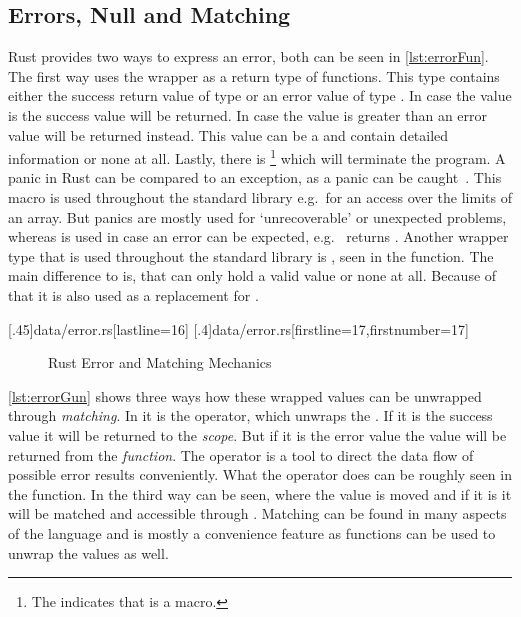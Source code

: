 \documentclass[thesis]{subfiles}
\begin{document}
  \subsection{Errors, Null and Matching}\label{sec:rustErr}
    Rust provides two ways to express an error, both can be seen in \autoref{lst:errorFun}.
    The first way uses the  wrapper as a return type of functions.
    This type contains either the success return value of type \T or an error value of type .
    In case the value is  the success value will be returned.
    In case the value is greater than  an error value will be returned instead.
    This value can be a \struct and contain detailed information or none at all.
    Lastly, there is \footnote{%
      The \codr{!} indicates that  is a macro.
    } which will terminate the program.
    A panic in Rust can be compared to an exception, as a panic can be caught~\autocite[std::panic::catch\_unwind]{rust-doc}.
    This macro is used throughout the standard library e.g.~for an access over the limits of an array.
    But panics are mostly used for `unrecoverable' or unexpected problems, whereas  is used in case an error can be expected, e.g.~ returns .
    Another wrapper type that is used throughout the standard library is \OptionT, seen in the  function.
    The main difference to  is, that  can only hold a valid value or none at all.
    Because of that it is also used as a replacement for .

    \LstTikzBox{\errorFun}[.45\linewidth]{data/error.rs}[lastline=16]
    \LstTikzBox{\errorGun}[.4\linewidth]{data/error.rs}[firstline=17,firstnumber=17]

    \begin{figure}[ht]
      \captionsetup{type=lstlisting}
       \hfill%
      \caption{Rust Error and Matching Mechanics}\label{lst:error}
    \end{figure}

    \autoref{lst:errorGun} shows three ways how these wrapped values can be unwrapped through \emph{matching}.
    In  it is the  operator, which unwraps the .
    If it is the success value it will be returned to the \emph{scope}.
    But if it is the error value the value will be returned from the \emph{function}.
    The  operator is a tool to direct the data flow of possible error results conveniently.
    What the  operator does can be roughly seen in the  function.
    In  the third way can be seen, where the \OptionT value is moved and if it is \Some it will be matched and accessible through .
    Matching can be found in many aspects of the language and is mostly a convenience feature as functions can be used to unwrap the values as well.%
    ~\autocite[Enums and Pattern Matching]{rust-doc}
\end{document}
